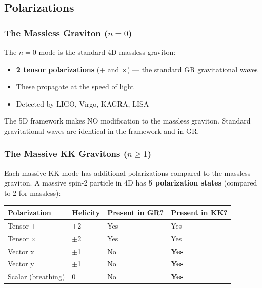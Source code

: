 \documentclass[aps,prd,preprint,superscriptaddress,longbibliography,floatfix]{revtex4-2}
\theoremstyle{remark}
\begin{document}
\subsection{Polarizations}


\subsubsection{The Massless Graviton ($n = 0$)}

The $n = 0$ mode is the standard 4D massless graviton:

\begin{itemize}
  \item \textbf{2 tensor polarizations} (+ and $\times$) --- the standard GR gravitational waves
  \item These propagate at the speed of light
  \item Detected by LIGO, Virgo, KAGRA, LISA
\end{itemize}

The 5D framework makes NO modification to the massless graviton. Standard gravitational waves are identical in the framework and in GR.


\subsubsection{The Massive KK Gravitons ($n \geq 1$)}

Each massive KK mode has additional polarizations compared to the massless graviton. A massive spin-2 particle in 4D has \textbf{5 polarization states} (compared to 2 for massless):


\begin{table}[H]
\begin{ruledtabular}
\begin{tabular}{p{3.8cm}p{3.8cm}p{3.8cm}p{3.8cm}}
Polarization & Helicity & Present in GR? & Present in KK? \\
\hline
Tensor + & $\pm$2 & Yes & Yes \\
Tensor $\times$ & $\pm$2 & Yes & Yes \\
Vector x & $\pm$1 & No & \textbf{Yes} \\
Vector y & $\pm$1 & No & \textbf{Yes} \\
Scalar (breathing) & 0 & No & \textbf{Yes} \\
\end{tabular}
\end{ruledtabular}
\end{table}
\end{document}

